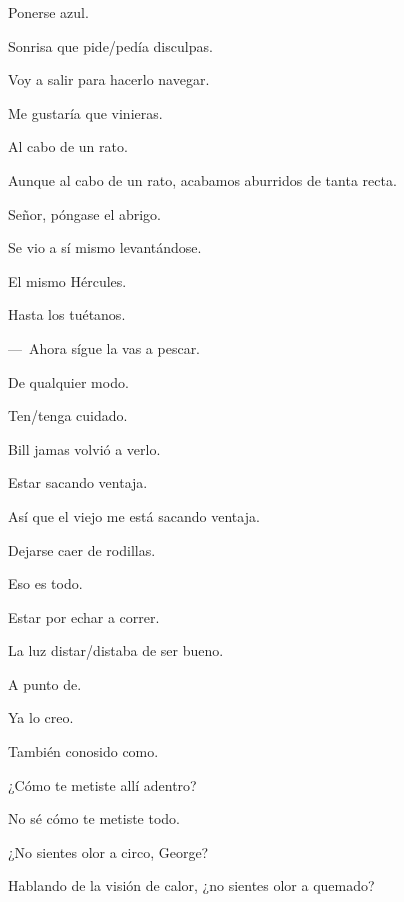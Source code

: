 \sk
Ponerse azul. 

\sk
Sonrisa que pide/pedía disculpas. 

\sk
Voy a salir para hacerlo navegar. \nb{}

\sk
Me gustaría que vinieras. 

\sk
Al cabo de un rato. 

\sk
Aunque al cabo de un rato, acabamos aburridos de tanta recta. 

\sk
Señor, póngase el abrigo. \nb{}

\sk
Se vio a sí mismo levantándose. 

\sk
El mismo Hércules. 

\sk
Hasta los tuétanos. 

\sk
---~Ahora sígue la vas a pescar. 

\sk
De qualquier modo. 

\sk
Ten/tenga cuidado. 

\sk
Bill jamas volvió a verlo. 

\sk
Estar sacando ventaja. 

\sk
Así que el viejo me está sacando ventaja. 

\sk
Dejarse caer de rodillas. 

\sk
Eso es todo. 

\sk
Estar por echar a correr. 

\sk
La luz distar/distaba de ser bueno. 

\sk
A punto de. 

\sk
Ya lo creo. 

\sk
También conosido como. 

\sk
¿Cómo te metiste allí adentro? 

\sk
No sé cómo te metiste todo. 

\sk
¿No sientes olor a circo, George? \nb{}

\sk
Hablando de la visión de calor, ¿no sientes olor a quemado? 

